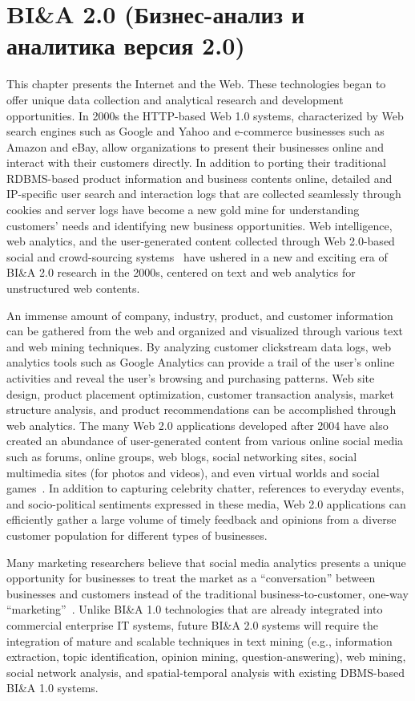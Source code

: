 \section{BI\&A 2.0 (Бизнес-анализ и аналитика версия 2.0)}
This chapter presents the Internet and the Web. These technologies began to offer
unique data collection and analytical research and development opportunities. In 2000s the HTTP-based Web 1.0 systems,
characterized by Web search engines such as Google and
Yahoo and e-commerce businesses such as Amazon and
eBay, allow organizations to present their businesses online
and interact with their customers directly. 
In addition to porting their traditional RDBMS-based product information
and business contents online, detailed and IP-specific user
search and interaction logs that are collected seamlessly
through cookies and server logs have become a new gold
mine for understanding customers’ needs and identifying new
business opportunities. Web intelligence, web analytics, and
the user-generated content collected through Web 2.0-based
social and crowd-sourcing systems~\cite{OReilly:2005} have ushered in a new and exciting era of
BI\&A 2.0 research in the 2000s, centered on text and web
analytics for unstructured web contents.

An immense amount of company, industry, product, and
customer information can be gathered from the web and
organized and visualized through various text and web mining
techniques. By analyzing customer clickstream data logs,
web analytics tools such as Google Analytics can provide a
trail of the user’s online activities and reveal the user’s
browsing and purchasing patterns. Web site design, product
placement optimization, customer transaction analysis, market
structure analysis, and product recommendations can be
accomplished through web analytics. The many Web 2.0
applications developed after 2004 have also created an abundance of user-generated content from various online social
media such as forums, online groups, web blogs, social networking sites, social multimedia sites (for photos and videos),
and even virtual worlds and social games~\cite{OReilly:2005}. In
addition to capturing celebrity chatter, references to everyday
events, and socio-political sentiments expressed in these
media, Web 2.0 applications can efficiently gather a large
volume of timely feedback and opinions from a diverse
customer population for different types of businesses.

Many marketing researchers believe that social media
analytics presents a unique opportunity for businesses to treat
the market as a “conversation” between businesses and
customers instead of the traditional business-to-customer,
one-way “marketing”~\cite{Lin:2011}. Unlike BI\&A 1.0
technologies that are already integrated into commercial
enterprise IT systems, future BI\&A 2.0 systems will require
the integration of mature and scalable techniques in text
mining (e.g., information extraction, topic identification,
opinion mining, question-answering), web mining, social
network analysis, and spatial-temporal analysis with existing
DBMS-based BI\&A 1.0 systems.

